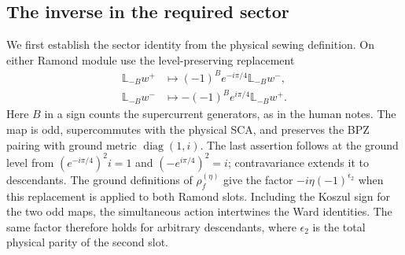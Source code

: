 \documentclass[12pt]{article}
\newcommand{\ie}{\begin{equation}\begin{aligned}}
\newcommand{\fe}{\end{aligned}\end{equation}}
\numberwithin{equation}{section}
\begin{document}
\subsection{The inverse in the required sector}

We first establish the sector identity from the physical sewing
definition.  On either Ramond module use the level-preserving replacement
\ie
 \mathbb L_{-B}w^+&\longmapsto
 (-1)^B e^{-i\pi/4}\mathbb L_{-B}w^-,\\
 \mathbb L_{-B}w^-&\longmapsto
 -(-1)^B e^{i\pi/4}\mathbb L_{-B}w^+.
\fe
Here $B$ in a sign counts the supercurrent generators, as in the human
notes.  The map is odd, supercommutes with the physical SCA, and
preserves the BPZ pairing with ground metric $\operatorname{diag}(1,i)$.
The last assertion follows at the ground level from
$(e^{-i\pi/4})^2 i=1$ and $(-e^{i\pi/4})^2=i$; contravariance extends
it to descendants.  The ground definitions of $\rho_f^{(\eta)}$ give
the factor $-i\eta(-1)^{\epsilon_2}$ when this replacement is applied
to both Ramond slots.  Including the Koszul sign for the two odd maps,
the simultaneous action intertwines the Ward identities.  The same
factor therefore holds for arbitrary descendants, where $\epsilon_2$
is the total physical parity of the second slot.
\end{document}
